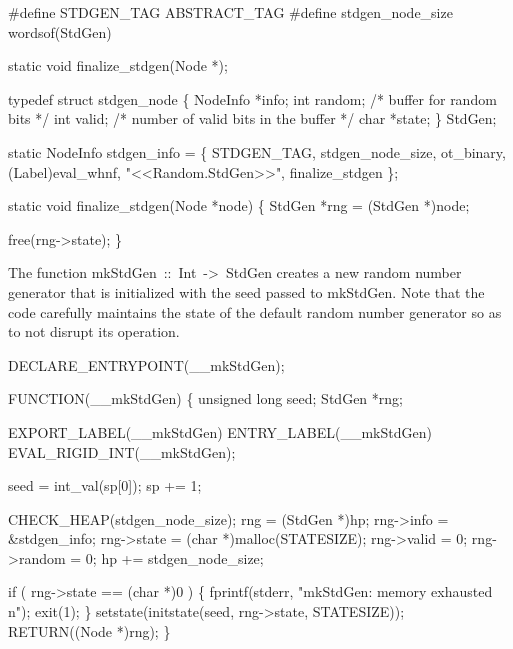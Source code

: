 \nwenddocs{}\plusendmoddef\nwstartdeflinemarkup{}\nwenddeflinemarkup
#define STDGEN_TAG       ABSTRACT_TAG
#define stdgen_node_size wordsof(StdGen)

static void finalize_stdgen(Node *);

typedef struct stdgen_node \{
    NodeInfo *info;
    int      random;            /* buffer for random bits */
    int      valid;             /* number of valid bits in the buffer */
    char     *state;
\} StdGen;

static NodeInfo stdgen_info = \{
    STDGEN_TAG, stdgen_node_size, ot_binary, (Label)eval_whnf,
    "<<Random.StdGen>>", finalize_stdgen
\};

static void
finalize_stdgen(Node *node)
\{
    StdGen *rng = (StdGen *)node;

    free(rng->state);
\}

\nwendcode{}\nwdocspar
The function {\Tt{}mkStdGen\ ::\ Int\ ->\ StdGen\nwendquote} creates a new random number
generator that is initialized with the seed passed to {\Tt{}mkStdGen\nwendquote}.
Note that the code carefully maintains the state of the default random
number generator so as to not disrupt its operation.

\nwenddocs{}\plusendmoddef\nwstartdeflinemarkup{}\nwenddeflinemarkup
DECLARE_ENTRYPOINT(__mkStdGen);

FUNCTION(__mkStdGen)
\{
    unsigned long seed;
    StdGen        *rng;

    EXPORT_LABEL(__mkStdGen)
 ENTRY_LABEL(__mkStdGen)
    EVAL_RIGID_INT(__mkStdGen);

    seed = int_val(sp[0]);
    sp  += 1;

    CHECK_HEAP(stdgen_node_size);
    rng         = (StdGen *)hp;
    rng->info   = &stdgen_info;
    rng->state  = (char *)malloc(STATESIZE);
    rng->valid  = 0;
    rng->random = 0;
    hp         += stdgen_node_size;

    if ( rng->state == (char *)0 )
    \{
        fprintf(stderr, "mkStdGen: memory exhausted\\n");
        exit(1);
    \}
    setstate(initstate(seed, rng->state, STATESIZE));
    RETURN((Node *)rng);
\}

